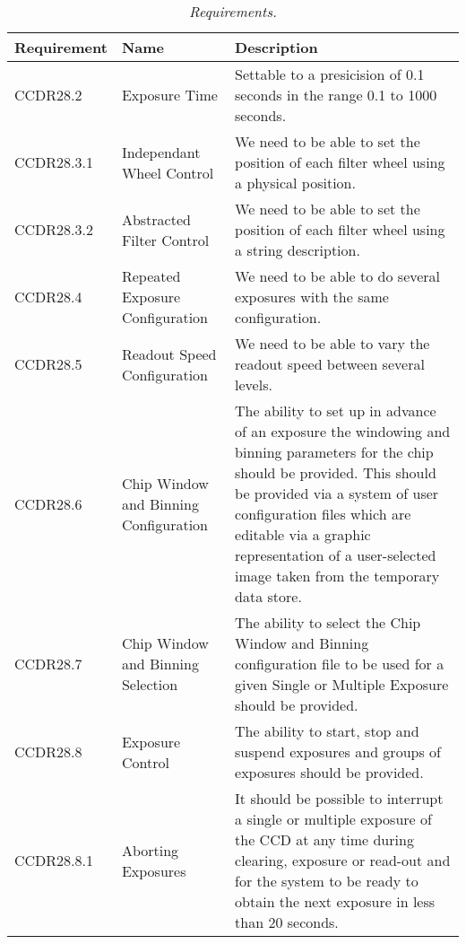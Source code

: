 \documentclass[10pt,a4paper]{article}
\begin{document}
\begin{table}[!h]
\begin{center}
\begin{tabular}{|l|l|p{19em}|}
\hline
{\bf Requirement} & {\bf Name} & {\bf Description} \\ \hline
CCDR28.2	& Exposure Time & Settable to a presicision of 0.1 seconds in the range 0.1 to 1000 seconds.\\ \hline
CCDR28.3.1	& Independant Wheel Control & We need to be able to set the position of each filter wheel using 
		a physical position.\\ \hline
CCDR28.3.2	& Abstracted Filter Control & We need to be able to set the position of each filter wheel 
		using a string description. \\ \hline
CCDR28.4	& Repeated Exposure Configuration & We need to be able to do several exposures with the same
		configuration. \\ \hline
CCDR28.5	& Readout Speed Configuration & We need to be able to vary the readout speed between several
		levels. \\ \hline
CCDR28.6	& Chip Window and Binning Configuration & The ability to set up in advance of an exposure 
		the windowing and binning parameters
		for the chip should be provided.  This should be provided via a
		system of user configuration files which are editable via a graphic
		representation of a user-selected image taken from the temporary data store.\\ \hline
CCDR28.7	& Chip Window and Binning Selection & The ability to select the Chip Window and Binning 
		configuration file to be used for a given Single or Multiple Exposure should be provided.\\ \hline
CCDR28.8	& Exposure Control & The ability to start, stop and suspend exposures and groups of exposures
		should be provided.\\ \hline
CCDR28.8.1	& Aborting Exposures & It should be possible to interrupt a single or multiple exposure of 
		the CCD at any time during clearing, 
		exposure or read-out and for the system to be ready to obtain the
		next exposure in less than 20 seconds. \\ \hline
\end{tabular}
\end{center}
\caption{\em Requirements.}
\label{tab:requirements1}
\end{table}
\end{document}
